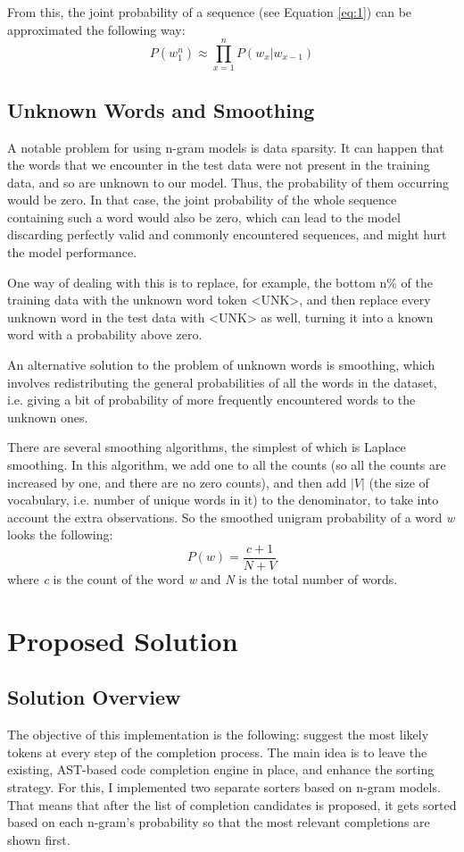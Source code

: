 \documentclass[sigplan,screen]{acmart}
\begin{document}
From this, the joint probability of a sequence (see Equation \ref{eq:1}) can be approximated the following way:
\begin{equation}
    P(w_1^n) \approx \prod_{x=1}^n P(w_x|w_{x-1})
\end{equation}

\subsection{Unknown Words and Smoothing}
A notable problem for using n-gram models is data sparsity. It can happen that the words that we encounter in the test data were not present in the training data, and so are unknown to our model. Thus, the probability of them occurring would be zero. In that case, the joint probability of the whole sequence containing such a word would also be zero, which can lead to the model discarding perfectly valid and commonly encountered sequences, and might hurt the model performance.

One way of dealing with this is to replace, for example, the bottom n\% of the training data with the unknown word token <UNK>, and then replace every unknown word in the test data with <UNK> as well, turning it into a known word with a probability above zero.

An alternative solution to the problem of unknown words is smoothing, which involves redistributing the general probabilities of all the words in the dataset, i.e. giving a bit of probability of more frequently encountered words to the unknown ones.

There are several smoothing algorithms, the simplest of which is Laplace smoothing. In this algorithm, we add one to all the counts (so all the counts are increased by one, and there are no zero counts), and then add $|V|$ (the size of vocabulary, i.e. number of unique words in it) to the denominator, to take into account the extra observations. So the smoothed unigram probability of a word \textit{w} looks the following:
\begin{equation}
    P(w)=\frac{c+1}{N+V}
\end{equation}
where \textit{c} is the count of the word \textit{w} and \textit{N} is the total number of words.

\section{Proposed Solution}
\subsection{Solution Overview}
The objective of this implementation is the following: suggest the most likely tokens at every step of the completion process. The main idea is to leave the existing, AST-based code completion engine in place, and enhance the sorting strategy. For this, I implemented two separate sorters based on n-gram models. That means that after the list of completion candidates is proposed, it gets sorted based on each n-gram's probability so that the most relevant completions are shown first.
\end{document}
